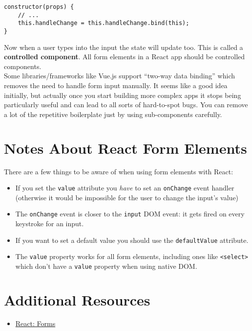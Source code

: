 \begin{verbatim}
constructor(props) {
    // ...
    this.handleChange = this.handleChange.bind(this);
}
\end{verbatim}

Now when a user types into the input the state will update too. This is called a \textbf{controlled component}. All form elements in a React app should be controlled components.
\\

Some libraries/frameworks like Vue.js support ``two-way data binding'' which removes the need to handle form input manually. It seems like a good idea initially, but actually once you start building more complex apps it stops being particularly useful and can lead to all sorts of hard-to-spot bugs. You can remove a lot of the repetitive boilerplate just by using sub-components carefully.


\pagebreak


\section{Notes About React Form Elements}

There are a few things to be aware of when using form elements with React:

\begin{itemize}
    \item If you set the \texttt{value} attribute you \textit{have} to set an \texttt{onChange} event handler (otherwise it would be impossible for the user to change the input's value)
    \item The \texttt{onChange} event is closer to the \texttt{input} DOM event: it gets fired on every keystroke for an input.
    \item If you want to set a default value you should use the \texttt{defaultValue} attribute.
    \item The \texttt{value} property works for all form elements, including ones like \texttt{<select>} which don't have a \texttt{value} property when using native DOM.
\end{itemize}


\section{Additional Resources}

\begin{itemize}[leftmargin=*]
    \item \href{https://reactjs.org/docs/forms.html}{React: Forms}
\end{itemize}
